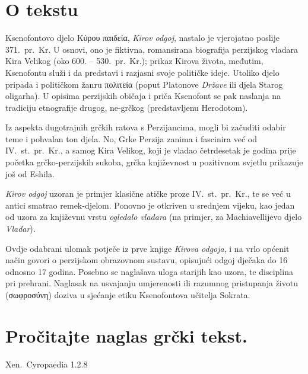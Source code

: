 


\section*{O tekstu}

Ksenofontovo djelo \textgreek[variant=ancient]{Κύρου παιδεία,} \textit{Kirov odgoj}, nastalo je vjerojatno poslije 371.\ pr.~Kr. U osnovi, ono je fiktivna, romansirana biografija perzijskog vladara Kira Velikog (oko 600. – 530.\ pr.~Kr.); prikaz Kirova života, međutim, Ksenofontu služi i da predstavi i razjasni svoje političke ideje. Utoliko djelo pripada i političkom žanru \textgreek[variant=ancient]{πολιτεία} (poput Platonove \textit{Države} ili djela Starog oligarha). U opisima perzijskih običaja i priča Ksenofont se pak naslanja na tradiciju etnografije drugog, ne-grčkog (predstavljenu Herodotom). 

Iz aspekta dugotrajnih grčkih ratova s Perzijancima, mogli bi začuditi odabir teme i pohvalan ton djela. No, Grke Perzija zanima i fascinira već od IV.~st.\ pr.~Kr., a samog Kira Velikog, koji je vladao četrdesetak je godina prije početka grčko-perzijskih sukoba, grčka književnost u pozitivnom svjetlu prikazuje još od Eshila. 

\textit{Kirov odgoj} uzoran je primjer klasične atičke proze IV.~st.\ pr.~Kr., te se već u antici smatrao remek-djelom. Ponovno je otkriven u srednjem vijeku, kao jedan od uzora za književnu vrstu \textit{ogledalo vladara} (na primjer, za Machiavellijevo djelo \textit{Vladar}). 

Ovdje odabrani ulomak potječe iz prve knjige \textit{Kirova odgoja}, i na vrlo općenit način govori o perzijskom obrazovnom sustavu, opisujući odgoj dječaka do 16 odnosno 17 godina. Posebno se naglašava uloga starijih kao uzora, te disciplina pri prehrani. Naglasak na usvajanju umjerenosti ili razumnog pristupanja životu \textgreek[variant=ancient]{(σωφροσύνη)} doziva u sjećanje etiku Ksenofontova učitelja Sokrata.

\newpage

\section*{Pročitajte naglas grčki tekst.}

Xen.\ Cyropaedia 1.2.8

